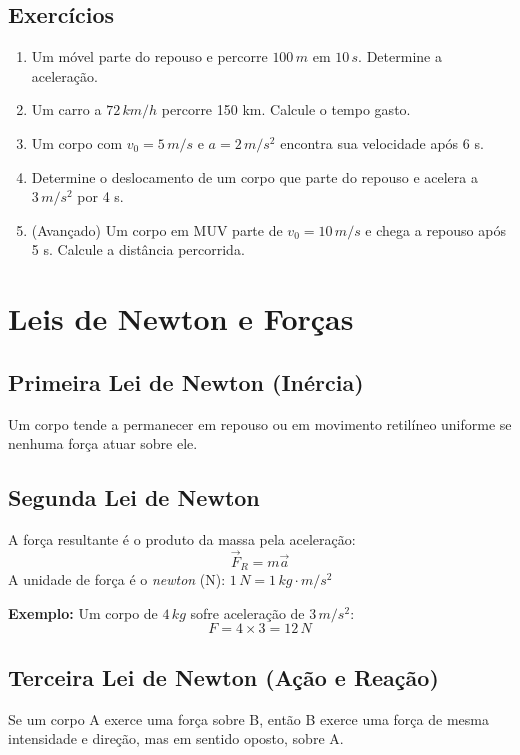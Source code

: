 \documentclass[12pt,a4paper]{article}
\begin{document}
\subsection{Exercícios}
\begin{enumerate}
\item Um móvel parte do repouso e percorre $100\,m$ em $10\,s$. Determine a aceleração.
\item Um carro a $72\,km/h$ percorre 150 km. Calcule o tempo gasto.
\item Um corpo com $v_0 = 5\,m/s$ e $a = 2\,m/s^2$ encontra sua velocidade após 6 s.
\item Determine o deslocamento de um corpo que parte do repouso e acelera a $3\,m/s^2$ por 4 s.
\item (Avançado) Um corpo em MUV parte de $v_0 = 10\,m/s$ e chega a repouso após 5 s. Calcule a distância percorrida.
\end{enumerate}

\section{Leis de Newton e Forças}

\subsection{Primeira Lei de Newton (Inércia)}
Um corpo tende a permanecer em repouso ou em movimento retilíneo uniforme se nenhuma força atuar sobre ele.

\subsection{Segunda Lei de Newton}
A força resultante é o produto da massa pela aceleração:
\[
\vec{F}_R = m\vec{a}
\]
A unidade de força é o \textit{newton} (N): $1\,N = 1\,kg \cdot m/s^2$

\textbf{Exemplo:} Um corpo de $4\,kg$ sofre aceleração de $3\,m/s^2$:
\[
F = 4 \times 3 = 12\,N
\]

\subsection{Terceira Lei de Newton (Ação e Reação)}
Se um corpo A exerce uma força sobre B, então B exerce uma força de mesma intensidade e direção, mas em sentido oposto, sobre A.
\end{document}
